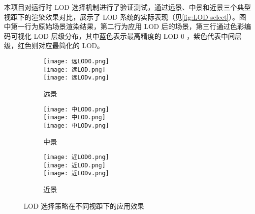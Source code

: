 本项目对运行时 LOD 选择机制进行了验证测试，通过远景、中景和近景三个典型视距下的渲染效果对比，展示了 LOD 系统的实际表现（见\autoref{fig:LOD select}）。图中第一行为原始场景渲染结果，第二行为应用 LOD 后的场景，第三行通过色彩编码可视化 LOD 层级分布，其中蓝色表示最高精度的 LOD 0 ，紫色代表中间层级，红色则对应最简化的 LOD。

\begin{figure*}[h]
    \centering
    \begin{subfigure}[b]{0.32\linewidth}
        \centering
        \texttt{[image: 远LOD0.png]}\\
        \vspace{0.1cm}
        \texttt{[image: 远LOD.png]}\\
        \vspace{0.1cm}
        \texttt{[image: 远LODv.png]}
        \caption{远景}
    \end{subfigure}%
    \hfill %
    \begin{subfigure}[b]{0.32\linewidth}
        \centering
        \texttt{[image: 中LOD0.png]}\\
        \vspace{0.1cm}
        \texttt{[image: 中LOD.png]}\\
        \vspace{0.1cm}
        \texttt{[image: 中LODv.png]}
        \caption{中景}
    \end{subfigure}%
    \hfill %
    \begin{subfigure}[b]{0.32\linewidth}
        \centering
        \texttt{[image: 近LOD0.png]}\\
        \vspace{0.1cm}
        \texttt{[image: 近LOD.png]}\\
        \vspace{0.1cm}
        \texttt{[image: 近LODv.png]}
        \caption{近景}
    \end{subfigure}
    \caption{LOD 选择策略在不同视距下的应用效果}
    \label{fig:LOD select}
\end{figure*}

